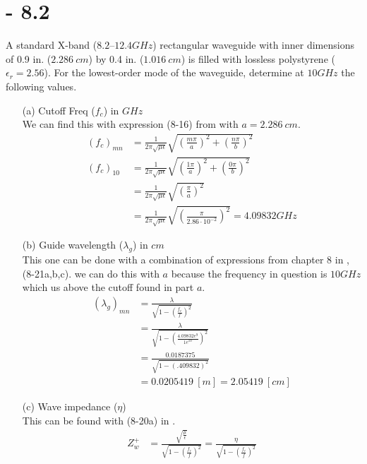 \documentclass[12pt]{article}
\begin{document}
\section{- 8.2}
A standard X-band ($8.2–12.4 GHz$) rectangular waveguide with inner dimensions of 0.9 in. ($2.286\ cm$) by 0.4 in. ($1.016\ cm$) is filled with lossless polystyrene ($\epsilon_r = 2.56$). For the lowest-order mode of the waveguide, determine at $10 GHz$ the following values.
\begin{itemize}
\item[(a)] Cutoff Freq ($f_c$) in $GHz$\\
  We can find this with expression (8-16) from \cite{balanis_2012} with $a = 2.286\ cm$.
  \begin{align*}
    (f_{c})_{mn} &= \frac{1}{2\pi\sqrt{\mu\epsilon}}\sqrt{\left(\frac{m\pi}{a}\right)^2 + \left(\frac{n\pi}{b}\right)^2}\\
    (f_{c})_{10}  &= \frac{1}{2\pi\sqrt{\mu\epsilon}}\sqrt{\left(\frac{1\pi}{a}\right)^2 + \left(\frac{0\pi}{b}\right)^2}\\
                 &= \frac{1}{2\pi\sqrt{\mu\epsilon}}\sqrt{\left(\frac{\pi}{a}\right)^2}\\
    &= \frac{1}{2\pi\sqrt{\mu\epsilon}}\sqrt{\left(\frac{\pi}{2.86\cdot 10^{-2}}\right)^2} = 4.09832 GHz
  \end{align*}
\item[(b)] Guide wavelength ($\lambda_g$) in $cm$\\
  This one can be done with a combination of expressions from chapter 8 in \cite{balanis_2012}, (8-21a,b,c). we can do this with $a$ because the frequency in question is $10GHz$ which us above the cutoff found in part $a$.
  \begin{align*}
    (\lambda_g)_{mn} &= \frac{\lambda}{\sqrt{1-\left(\frac{f_c}{f}\right)^2}}\\
                     &= \frac{\lambda}{\sqrt{1-\left(\frac{4.09832e^{9}}{1e^{10}}\right)^2}}\\
                     &= \frac{0.0187375}{\sqrt{1-\left(.409832\right)^2}}\\
                     &= 0.0205419\ [m] = 2.05419\ [cm]
  \end{align*}
  \newpage
\item[(c)] Wave impedance ($\eta$)\\
  This can be found with (8-20a) in \cite{balanis_2012}.
  \begin{align*}
    Z_w^+ &= \frac{\sqrt{\frac{\mu}{\epsilon}}}{\sqrt{1-\left(\frac{f_c}{f}\right)^2}} = \frac{\eta}{\sqrt{1-\left(\frac{f_c}{f}\right)^2}}\\

\end{align*}
\end{itemize}
\end{document}
